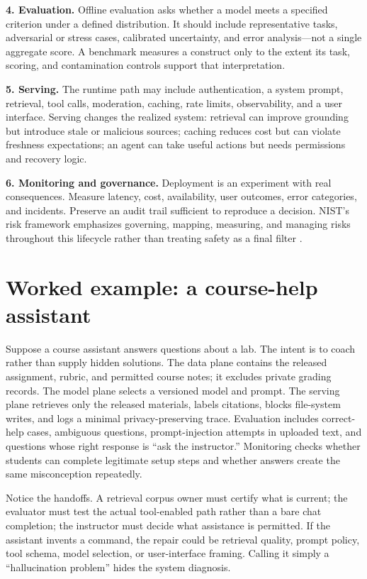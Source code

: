 \documentclass[11pt]{article}
\begin{document}
\textbf{4. Evaluation.} Offline evaluation asks whether a model meets a specified criterion under a defined distribution. It should include representative tasks, adversarial or stress cases, calibrated uncertainty, and error analysis---not a single aggregate score. A benchmark measures a construct only to the extent its task, scoring, and contamination controls support that interpretation.

\textbf{5. Serving.} The runtime path may include authentication, a system prompt, retrieval, tool calls, moderation, caching, rate limits, observability, and a user interface. Serving changes the realized system: retrieval can improve grounding but introduce stale or malicious sources; caching reduces cost but can violate freshness expectations; an agent can take useful actions but needs permissions and recovery logic.

\textbf{6. Monitoring and governance.} Deployment is an experiment with real consequences. Measure latency, cost, availability, user outcomes, error categories, and incidents. Preserve an audit trail sufficient to reproduce a decision. NIST's risk framework emphasizes governing, mapping, measuring, and managing risks throughout this lifecycle rather than treating safety as a final filter \cite{nist2023}.

\section{Worked example: a course-help assistant}
Suppose a course assistant answers questions about a lab. The intent is to coach rather than supply hidden solutions. The data plane contains the released assignment, rubric, and permitted course notes; it excludes private grading records. The model plane selects a versioned model and prompt. The serving plane retrieves only the released materials, labels citations, blocks file-system writes, and logs a minimal privacy-preserving trace. Evaluation includes correct-help cases, ambiguous questions, prompt-injection attempts in uploaded text, and questions whose right response is ``ask the instructor.'' Monitoring checks whether students can complete legitimate setup steps and whether answers create the same misconception repeatedly.

Notice the handoffs. A retrieval corpus owner must certify what is current; the evaluator must test the actual tool-enabled path rather than a bare chat completion; the instructor must decide what assistance is permitted. If the assistant invents a command, the repair could be retrieval quality, prompt policy, tool schema, model selection, or user-interface framing. Calling it simply a ``hallucination problem'' hides the system diagnosis.
\end{document}
